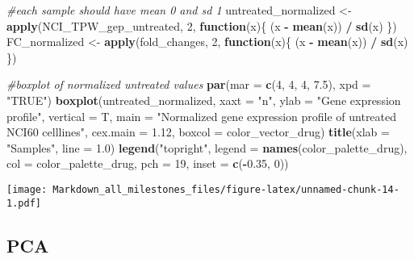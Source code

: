 \documentclass[]{article}
\newenvironment{Shaded}{\begin{snugshade}}{\end{snugshade}}
\newcommand{\CommentTok}[1]{\textcolor[rgb]{0.56,0.35,0.01}{\textit{#1}}}
\newcommand{\ControlFlowTok}[1]{\textcolor[rgb]{0.13,0.29,0.53}{\textbf{#1}}}
\newcommand{\DataTypeTok}[1]{\textcolor[rgb]{0.13,0.29,0.53}{#1}}
\newcommand{\DecValTok}[1]{\textcolor[rgb]{0.00,0.00,0.81}{#1}}
\newcommand{\FloatTok}[1]{\textcolor[rgb]{0.00,0.00,0.81}{#1}}
\newcommand{\KeywordTok}[1]{\textcolor[rgb]{0.13,0.29,0.53}{\textbf{#1}}}
\newcommand{\NormalTok}[1]{#1}
\newcommand{\OperatorTok}[1]{\textcolor[rgb]{0.81,0.36,0.00}{\textbf{#1}}}
\newcommand{\StringTok}[1]{\textcolor[rgb]{0.31,0.60,0.02}{#1}}
\begin{document}
\begin{Shaded}
\begin{Highlighting}[]
\CommentTok{#each sample should have mean 0 and sd 1}
\NormalTok{untreated_normalized <-}\StringTok{ }\KeywordTok{apply}\NormalTok{(NCI_TPW_gep_untreated, }\DecValTok{2}\NormalTok{, }\ControlFlowTok{function}\NormalTok{(x)\{}
\NormalTok{  (x }\OperatorTok{-}\StringTok{ }\KeywordTok{mean}\NormalTok{(x)) }\OperatorTok{/}\StringTok{ }\KeywordTok{sd}\NormalTok{(x)}
\NormalTok{\})}
\NormalTok{FC_normalized <-}\StringTok{ }\KeywordTok{apply}\NormalTok{(fold_changes, }\DecValTok{2}\NormalTok{, }\ControlFlowTok{function}\NormalTok{(x)\{}
\NormalTok{  (x }\OperatorTok{-}\StringTok{ }\KeywordTok{mean}\NormalTok{(x)) }\OperatorTok{/}\StringTok{ }\KeywordTok{sd}\NormalTok{(x)}
\NormalTok{\})}

\CommentTok{#boxplot of normalized untreated values}
\KeywordTok{par}\NormalTok{(}\DataTypeTok{mar =} \KeywordTok{c}\NormalTok{(}\DecValTok{4}\NormalTok{, }\DecValTok{4}\NormalTok{, }\DecValTok{4}\NormalTok{, }\FloatTok{7.5}\NormalTok{), }\DataTypeTok{xpd =} \StringTok{"TRUE"}\NormalTok{)}
\KeywordTok{boxplot}\NormalTok{(untreated_normalized, }
        \DataTypeTok{xaxt =} \StringTok{"n"}\NormalTok{, }
        \DataTypeTok{ylab =} \StringTok{"Gene expression profile"}\NormalTok{, }
        \DataTypeTok{vertical =}\NormalTok{  T, }
        \DataTypeTok{main =} \StringTok{"Normalized gene expression profile of untreated NCI60 celllines"}\NormalTok{,}
        \DataTypeTok{cex.main =} \FloatTok{1.12}\NormalTok{, }
        \DataTypeTok{boxcol =}\NormalTok{ color_vector_drug)}
\KeywordTok{title}\NormalTok{(}\DataTypeTok{xlab =} \StringTok{"Samples"}\NormalTok{, }\DataTypeTok{line =} \FloatTok{1.0}\NormalTok{)}
\KeywordTok{legend}\NormalTok{(}\StringTok{"topright"}\NormalTok{,}
       \DataTypeTok{legend =} \KeywordTok{names}\NormalTok{(color_palette_drug), }
       \DataTypeTok{col =}\NormalTok{ color_palette_drug, }
       \DataTypeTok{pch =} \DecValTok{19}\NormalTok{,}
       \DataTypeTok{inset =} \KeywordTok{c}\NormalTok{(}\OperatorTok{-}\FloatTok{0.35}\NormalTok{, }\DecValTok{0}\NormalTok{))}
\end{Highlighting}
\end{Shaded}

\texttt{[image: Markdown\_all\_milestones\_files/figure-latex/unnamed-chunk-14-1.pdf]}

\hypertarget{pca}{%
\subsection{PCA}\label{pca}}
\end{document}
